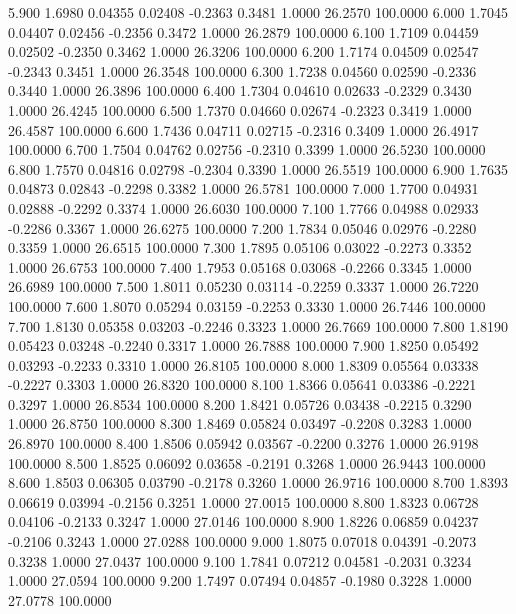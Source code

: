    5.900   1.6980   0.04355   0.02408  -0.2363   0.3481   1.0000  26.2570 100.0000
   6.000   1.7045   0.04407   0.02456  -0.2356   0.3472   1.0000  26.2879 100.0000
   6.100   1.7109   0.04459   0.02502  -0.2350   0.3462   1.0000  26.3206 100.0000
   6.200   1.7174   0.04509   0.02547  -0.2343   0.3451   1.0000  26.3548 100.0000
   6.300   1.7238   0.04560   0.02590  -0.2336   0.3440   1.0000  26.3896 100.0000
   6.400   1.7304   0.04610   0.02633  -0.2329   0.3430   1.0000  26.4245 100.0000
   6.500   1.7370   0.04660   0.02674  -0.2323   0.3419   1.0000  26.4587 100.0000
   6.600   1.7436   0.04711   0.02715  -0.2316   0.3409   1.0000  26.4917 100.0000
   6.700   1.7504   0.04762   0.02756  -0.2310   0.3399   1.0000  26.5230 100.0000
   6.800   1.7570   0.04816   0.02798  -0.2304   0.3390   1.0000  26.5519 100.0000
   6.900   1.7635   0.04873   0.02843  -0.2298   0.3382   1.0000  26.5781 100.0000
   7.000   1.7700   0.04931   0.02888  -0.2292   0.3374   1.0000  26.6030 100.0000
   7.100   1.7766   0.04988   0.02933  -0.2286   0.3367   1.0000  26.6275 100.0000
   7.200   1.7834   0.05046   0.02976  -0.2280   0.3359   1.0000  26.6515 100.0000
   7.300   1.7895   0.05106   0.03022  -0.2273   0.3352   1.0000  26.6753 100.0000
   7.400   1.7953   0.05168   0.03068  -0.2266   0.3345   1.0000  26.6989 100.0000
   7.500   1.8011   0.05230   0.03114  -0.2259   0.3337   1.0000  26.7220 100.0000
   7.600   1.8070   0.05294   0.03159  -0.2253   0.3330   1.0000  26.7446 100.0000
   7.700   1.8130   0.05358   0.03203  -0.2246   0.3323   1.0000  26.7669 100.0000
   7.800   1.8190   0.05423   0.03248  -0.2240   0.3317   1.0000  26.7888 100.0000
   7.900   1.8250   0.05492   0.03293  -0.2233   0.3310   1.0000  26.8105 100.0000
   8.000   1.8309   0.05564   0.03338  -0.2227   0.3303   1.0000  26.8320 100.0000
   8.100   1.8366   0.05641   0.03386  -0.2221   0.3297   1.0000  26.8534 100.0000
   8.200   1.8421   0.05726   0.03438  -0.2215   0.3290   1.0000  26.8750 100.0000
   8.300   1.8469   0.05824   0.03497  -0.2208   0.3283   1.0000  26.8970 100.0000
   8.400   1.8506   0.05942   0.03567  -0.2200   0.3276   1.0000  26.9198 100.0000
   8.500   1.8525   0.06092   0.03658  -0.2191   0.3268   1.0000  26.9443 100.0000
   8.600   1.8503   0.06305   0.03790  -0.2178   0.3260   1.0000  26.9716 100.0000
   8.700   1.8393   0.06619   0.03994  -0.2156   0.3251   1.0000  27.0015 100.0000
   8.800   1.8323   0.06728   0.04106  -0.2133   0.3247   1.0000  27.0146 100.0000
   8.900   1.8226   0.06859   0.04237  -0.2106   0.3243   1.0000  27.0288 100.0000
   9.000   1.8075   0.07018   0.04391  -0.2073   0.3238   1.0000  27.0437 100.0000
   9.100   1.7841   0.07212   0.04581  -0.2031   0.3234   1.0000  27.0594 100.0000
   9.200   1.7497   0.07494   0.04857  -0.1980   0.3228   1.0000  27.0778 100.0000
